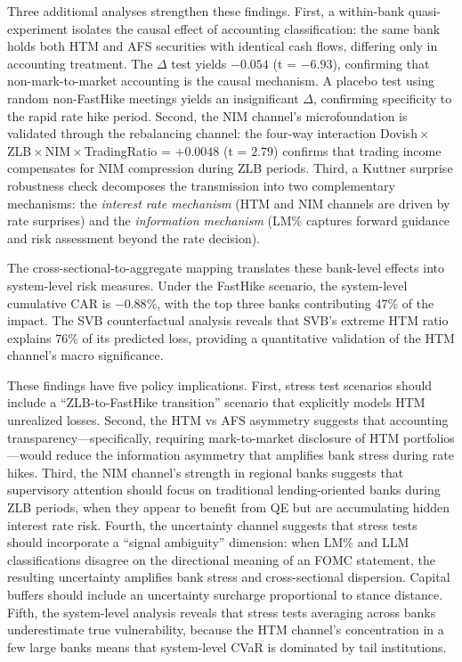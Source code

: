 \documentclass[12pt,a4paper]{article}
\begin{document}
Three additional analyses strengthen these findings. First, a within-bank quasi-experiment isolates the causal effect of accounting classification: the same bank holds both HTM and AFS securities with identical cash flows, differing only in accounting treatment. The $\Delta$ test yields $-0.054$ (t = $-6.93$), confirming that non-mark-to-market accounting is the causal mechanism. A placebo test using random non-FastHike meetings yields an insignificant $\Delta$, confirming specificity to the rapid rate hike period. Second, the NIM channel's microfoundation is validated through the rebalancing channel: the four-way interaction Dovish\,$\times$\,ZLB\,$\times$\,NIM\,$\times$\,TradingRatio = $+0.0048$ (t = $2.79$) confirms that trading income compensates for NIM compression during ZLB periods. Third, a Kuttner surprise robustness check decomposes the transmission into two complementary mechanisms: the \textit{interest rate mechanism} (HTM and NIM channels are driven by rate surprises) and the \textit{information mechanism} (LM\% captures forward guidance and risk assessment beyond the rate decision).

The cross-sectional-to-aggregate mapping translates these bank-level effects into system-level risk measures. Under the FastHike scenario, the system-level cumulative CAR is $-0.88$\%, with the top three banks contributing 47\% of the impact. The SVB counterfactual analysis reveals that SVB's extreme HTM ratio explains 76\% of its predicted loss, providing a quantitative validation of the HTM channel's macro significance.

These findings have five policy implications. First, stress test scenarios should include a ``ZLB-to-FastHike transition'' scenario that explicitly models HTM unrealized losses. Second, the HTM vs AFS asymmetry suggests that accounting transparency---specifically, requiring mark-to-market disclosure of HTM portfolios---would reduce the information asymmetry that amplifies bank stress during rate hikes. Third, the NIM channel's strength in regional banks suggests that supervisory attention should focus on traditional lending-oriented banks during ZLB periods, when they appear to benefit from QE but are accumulating hidden interest rate risk. Fourth, the uncertainty channel suggests that stress tests should incorporate a ``signal ambiguity'' dimension: when LM\% and LLM classifications disagree on the directional meaning of an FOMC statement, the resulting uncertainty amplifies bank stress and cross-sectional dispersion. Capital buffers should include an uncertainty surcharge proportional to stance distance. Fifth, the system-level analysis reveals that stress tests averaging across banks underestimate true vulnerability, because the HTM channel's concentration in a few large banks means that system-level CVaR is dominated by tail institutions.





\end{document}
